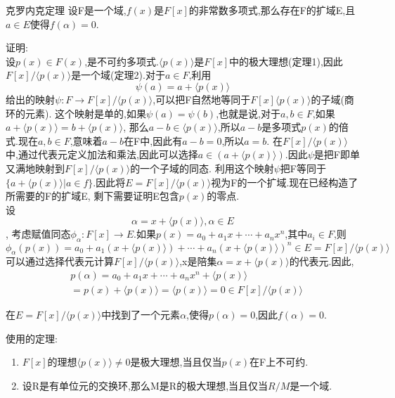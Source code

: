 \documentclass[oneside,openany]{ctexbook}
\begin{document}
\begin{definition}{克罗内克定理}{}
设F是一个域,$f(x)$是$F[x]$的非常数多项式,那么存在F的扩域E,且$a\in E$使得$f(\alpha)=0$.
\end{definition}

证明:\\
设$p(x)\in F(x)$,是不可约多项式.$\langle p(x)\rangle$是$F[x]$中的极大理想(定理1),因此
$F[x]/\langle p(x)\rangle$是一个域(定理2).对于$a\in F$,利用$$\psi (a)=a+\langle p(x)\rangle$$
给出的映射$\psi :F\rightarrow F[x]/\langle p(x)\rangle$,可以把F自然地等同于$F[x]\langle p(x)\rangle$的子域(商环的元素).
这个映射是单的,如果$\psi(a)=\psi(b)$,也就是说,对于$a,b\in F$,如果$a+\langle p(x)\rangle = b+\langle p(x)\rangle$,
那么$a-b\in \langle p(x)\rangle$,所以$a-b$是多项式$p(x)$的倍式.现在$a,b\in F$,意味着$a-b$在F中,因此有$a-b=0$,所以$a=b$.
在$F[x]/\langle p(x)\rangle$中,通过代表元定义加法和乘法,因此可以选择$a\in (a+\langle p(x)\rangle)$.因此$\psi$是把F即单又满地映射到$F[x]/\langle p(x)\rangle$的一个子域的同态.
利用这个映射$\psi$把F等同于$\{a+\langle p(x)\rangle |a\in f\}$.因此将$E=F[x]/\langle p(x)\rangle$视为F的一个扩域.现在已经构造了所需要的F的扩域E,
剩下需要证明E包含$p(x)$的零点.\\
设$$\alpha =x+\langle p(x)\rangle,\alpha \in E$$,
考虑赋值同态$\phi _{\alpha}:F[x]\rightarrow E$.如果$p(x)=a_0+a_1x+\cdots +a_nx^n$,其中$a_i \in F$,则
$$\phi _{\alpha}(p(x))=a_0+a_1(x+\langle p(x)\rangle)+\cdots +a_n(x+\langle p(x)\rangle)^n \in E = F[x]/\langle p(x)\rangle$$
可以通过选择代表元计算$F[x]/\langle p(x)\rangle$,x是陪集$\alpha =x+\langle p(x)\rangle$的代表元.因此,
\begin{align*}
 &   p(\alpha)=a_0+a_1x+\cdots +a_nx^n+\langle p(x)\rangle\\
 & =p(x)+\langle p(x)\rangle=\langle p(x)\rangle = 0\in F[x]/\langle p(x)\rangle
\end{align*}

在$E=F[x]/\langle p(x)\rangle$中找到了一个元素$\alpha$,使得$p(\alpha)=0$,因此$f(\alpha)=0$.

\newpage

使用的定理:
\begin{enumerate}
    \item $F[x]$的理想$\langle p(x)\rangle \neq {0}$是极大理想,当且仅当$p(x)$在F上不可约.
    \item 设R是有单位元的交换环,那么M是R的极大理想,当且仅当$R/M$是一个域.
\end{enumerate}
\end{document}

